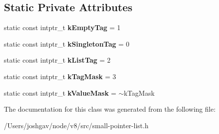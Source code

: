 \subsection*{Static Private Attributes}
\begin{DoxyCompactItemize}
\item 
static const intptr\+\_\+t {\bfseries k\+Empty\+Tag} = 1\hypertarget{classv8_1_1internal_1_1_small_pointer_list_a3b8effa3e86ff525b581602723ffeca9}{}\label{classv8_1_1internal_1_1_small_pointer_list_a3b8effa3e86ff525b581602723ffeca9}

\item 
static const intptr\+\_\+t {\bfseries k\+Singleton\+Tag} = 0\hypertarget{classv8_1_1internal_1_1_small_pointer_list_afa30a0a278a62ddf9b867f2bb0c3bbc6}{}\label{classv8_1_1internal_1_1_small_pointer_list_afa30a0a278a62ddf9b867f2bb0c3bbc6}

\item 
static const intptr\+\_\+t {\bfseries k\+List\+Tag} = 2\hypertarget{classv8_1_1internal_1_1_small_pointer_list_a29400107cc3fb3f72f8ba47aecb7c4dc}{}\label{classv8_1_1internal_1_1_small_pointer_list_a29400107cc3fb3f72f8ba47aecb7c4dc}

\item 
static const intptr\+\_\+t {\bfseries k\+Tag\+Mask} = 3\hypertarget{classv8_1_1internal_1_1_small_pointer_list_aac33c8b2b768a0be89f35aa871265e82}{}\label{classv8_1_1internal_1_1_small_pointer_list_aac33c8b2b768a0be89f35aa871265e82}

\item 
static const intptr\+\_\+t {\bfseries k\+Value\+Mask} = $\sim$k\+Tag\+Mask\hypertarget{classv8_1_1internal_1_1_small_pointer_list_adf8f75f5a3d3d0e334675bf68337b236}{}\label{classv8_1_1internal_1_1_small_pointer_list_adf8f75f5a3d3d0e334675bf68337b236}

\end{DoxyCompactItemize}


The documentation for this class was generated from the following file\+:\begin{DoxyCompactItemize}
\item 
/\+Users/joshgav/node/v8/src/small-\/pointer-\/list.\+h\end{DoxyCompactItemize}
